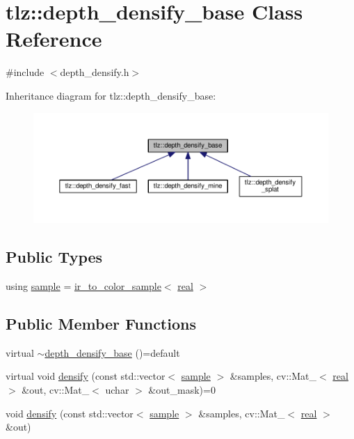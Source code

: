 \hypertarget{classtlz_1_1depth__densify__base}{}\section{tlz\+:\+:depth\+\_\+densify\+\_\+base Class Reference}
\label{classtlz_1_1depth__densify__base}


{\ttfamily \#include $<$depth\+\_\+densify.\+h$>$}



Inheritance diagram for tlz\+:\+:depth\+\_\+densify\+\_\+base\+:
\nopagebreak
\begin{figure}[H]
\begin{center}
\leavevmode
\includegraphics[width=350pt]{classtlz_1_1depth__densify__base__inherit__graph}
\end{center}
\end{figure}
\subsection*{Public Types}
\begin{DoxyCompactItemize}
\item 
using \hyperlink{classtlz_1_1depth__densify__base_a79b5945bdb65c2e1d988bf07ad730a09}{sample} = \hyperlink{structtlz_1_1ir__to__color__sample}{ir\+\_\+to\+\_\+color\+\_\+sample}$<$ \hyperlink{namespacetlz_a15fd37cce97f2b8b606af18c2615f602}{real} $>$
\end{DoxyCompactItemize}
\subsection*{Public Member Functions}
\begin{DoxyCompactItemize}
\item 
virtual \hyperlink{classtlz_1_1depth__densify__base_ad9958dcd4334e200fce135a7e59e3011}{$\sim$depth\+\_\+densify\+\_\+base} ()=default
\item 
virtual void \hyperlink{classtlz_1_1depth__densify__base_a97115be0d43315586af401293ec3c6df}{densify} (const std\+::vector$<$ \hyperlink{classtlz_1_1depth__densify__base_a79b5945bdb65c2e1d988bf07ad730a09}{sample} $>$ \&samples, cv\+::\+Mat\+\_\+$<$ \hyperlink{namespacetlz_a15fd37cce97f2b8b606af18c2615f602}{real} $>$ \&out, cv\+::\+Mat\+\_\+$<$ uchar $>$ \&out\+\_\+mask)=0
\item 
void \hyperlink{classtlz_1_1depth__densify__base_a6c61f919e71da09cc731a94fdecdaf21}{densify} (const std\+::vector$<$ \hyperlink{classtlz_1_1depth__densify__base_a79b5945bdb65c2e1d988bf07ad730a09}{sample} $>$ \&samples, cv\+::\+Mat\+\_\+$<$ \hyperlink{namespacetlz_a15fd37cce97f2b8b606af18c2615f602}{real} $>$ \&out)
\end{DoxyCompactItemize}


